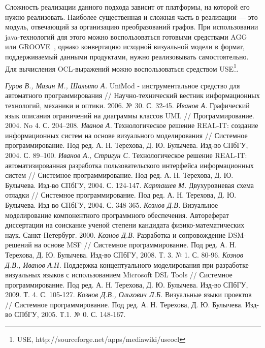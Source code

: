 \documentclass[a5paper]{article}
\begin{document}
Сложность реализации данного подхода зависит от платформы, на которой его нужно реализовать. Наиболее существенная и сложная часть в реализации — это модуль, отвечающий за организацию преобразований графов. При использовании java-технологий для этого можно воспользоваться готовыми средствами AGG~\cite{agg} или GROOVE~\cite{groove}, однако конвертацию исходной визуальной модели в формат, поддерживаемый данными продуктами, нужно реализовывать самостоятельно. Для вычисления OCL-выражений можно воспользоваться средством USE\footnote{USE, http://sourceforge.net/apps/mediawiki/useocl}.

\begin{thebibliography}{9001}
 \emph{Гуров В., Мазин М., Шалыто А.} UniMod - инструментальное средство для автоматного программирования // Научно-технический вестник информационных технологий, механики и оптики. 2006. № 30. С. 32-45.
 \emph{Иванов А.} Графический язык описания ограничений на диаграммы классов UML // Программирование. 2004. No 4. С. 204–208.
 \emph{Иванов А.} Технологическое решение REAL-IT: создание информационных систем на основе визуального моделирования // Системное программирование. Под ред. А. Н. Терехова, Д. Ю. Булычева. Изд-во СПбГУ, 2004. С. 89–100.
 \emph{Иванов А., Стригун С.} Технологическое решение REAL-IT: автоматизированная разработка пользовательского интерфейса информационных систем // Системное программирование. Под ред. А. Н. Терехова, Д. Ю. Булычева. Изд-во СПбГУ, 2004. С. 124-147.
 \emph{Карташев М.} Двухуровневая схема отладки // Системное программирование. Под ред. А. Н. Терехова, Д. Ю. Булычева. Изд-во СПбГУ, 2004. С. 348-365.
 \emph{Кознов Д.В.} Визуальное моделирование компонентного программного обеспечения.  Автореферат диссертации на соискание ученой степени кандидата физико-математических наук. Санкт-Петербург. 2000.
 \emph{Кознов Д.В.} Разработка и сопровождение DSM-решений на основе MSF // Системное программирование. Под ред. А. Н. Терехова, Д. Ю. Булычева. Изд-во СПбГУ, 2008. Т. 3. № 1. С. 80-96.
 \emph{Кознов Д.В., Иванов А.Н.} Поддержка концептуального моделирования при разработке визуальных языков с использованием Microsoft DSL Tools // Системное программирование. Под ред. А. Н. Терехова, Д. Ю. Булычева. Изд-во СПбГУ, 2009. Т. 4. С. 105-127.
 \emph{Кознов Д.В., Ольхович Л.Б.} Визуальные языки проектов // Системное программирование. Под ред. А. Н. Терехова, Д. Ю. Булычева. Изд-во СПбГУ, 2005. Т.1. № 0. С. 148-167.

\end{thebibliography}
\end{document}
